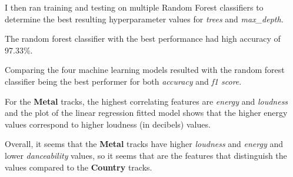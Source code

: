 \documentclass[12pt, a4paper]{extarticle}
\begin{document}


    I then ran training and testing on multiple Random Forest classifiers to determine
    the best resulting hyperparameter values for \textit{trees} and \textit{max\_depth.}



    The random forest classifier with the best performance had high accuracy of 97.33\%.






    Comparing the four machine learning models resulted with the random forest
    classifier being the best performer for both \textit{accuracy} and \textit{f1 score}.




    For the \textbf{Metal} tracks, the highest correlating features are \textit{energy}
    and \textit{loudness} and the plot of the linear regression fitted model shows that
    the higher energy values correspond to higher loudness (in decibels) values.






    Overall, it seems that the \textbf{Metal} tracks have higher \textit{loudness} and
    \textit{energy} and lower \textit{danceability} values, so it seems that are the
    features that distinguish the values compared to the \textbf{Country} tracks.


    
    
\end{document}
